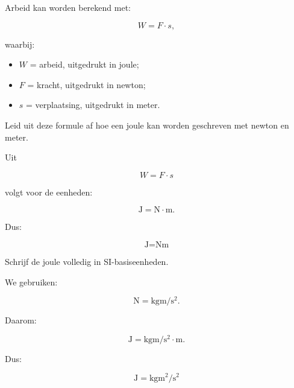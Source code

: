 \documentclass{ximera}
\begin{document}
\begin{oefening}{\oefB\ESS}

Arbeid kan worden berekend met:

\[
W = F \cdot s,
\]

waarbij:

\begin{itemize}
    \item $W$ = arbeid, uitgedrukt in joule;
    \item $F$ = kracht, uitgedrukt in newton;
    \item $s$ = verplaatsing, uitgedrukt in meter.
\end{itemize}

\begin{question}
Leid uit deze formule af hoe een joule kan worden geschreven met newton en meter.

\begin{oplossing}
Uit

\[
W = F \cdot s
\]

volgt voor de eenheden:

\[
\si{\joule}
=
\si{\newton}\cdot\si{\meter}.
\]

Dus:

\[
\boxed{
\si{\joule}
=
\si{\newton\meter}
}
\]
\end{oplossing}
\end{question}


\begin{question}
Schrijf de joule volledig in SI-basiseenheden.

\begin{oplossing}
We gebruiken:

\[
\si{\newton}
=
\si{\kilogram\meter\per\second\squared}.
\]

Daarom:

\[
\si{\joule}
=
\si{\kilogram\meter\per\second\squared}
\cdot
\si{\meter}.
\]

Dus:

\[
\boxed{
\si{\joule}
=
\si{\kilogram\meter\squared\per\second\squared}
}
\]
\end{oplossing}
\end{question}

\end{oefening}
\end{document}

